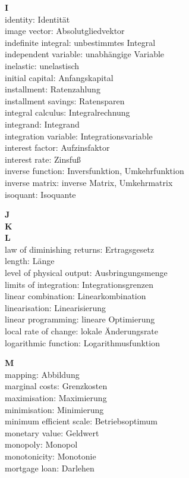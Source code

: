 \medskip
\noindent
{\bf I}\\
identity: Identit\"{a}t\\
image vector: Absolutgliedvektor\\
indefinite integral: unbestimmtes Integral\\
independent variable: unabh\"{a}ngige Variable\\
inelastic: unelastisch\\
initial capital: Anfangskapital\\
installment: Ratenzahlung\\
installment savings: Ratensparen\\
integral calculus: Integralrechnung\\
integrand: Integrand\\
integration variable: Integrationsvariable\\
interest factor: Aufzinsfaktor\\
interest rate: Zinsfu\ss\\
inverse function: Inversfunktion, Umkehrfunktion\\
inverse matrix: inverse Matrix, Umkehrmatrix\\
isoquant: Isoquante

\medskip
\noindent
{\bf J}\\

\medskip
\noindent
{\bf K}\\

\medskip
\noindent
{\bf L}\\
law of diminishing returns: Ertragsgesetz\\
length: L\"{an}ge\\
level of physical output: Ausbringungsmenge\\
limits of integration: Integrationsgrenzen\\
linear combination: Linearkombination\\
linearisation: Linearisierung\\
linear programming: lineare Optimierung\\
local rate of change: lokale \"{A}nderungsrate\\
logarithmic function: Logarithmusfunktion

\medskip
\noindent
{\bf M}\\
mapping: Abbildung\\
marginal costs: Grenzkosten\\
maximisation: Maximierung\\
minimisation: Minimierung\\
minimum efficient scale: Betriebsoptimum\\
monetary value: Geldwert\\
monopoly: Monopol\\
monotonicity: Monotonie\\
mortgage loan: Darlehen


